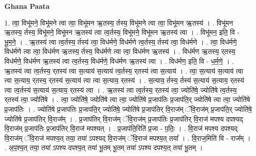 \documentclass[17pt]{extarticle}
\begin{document}
\textbf{Ghana Paata } \newline

1. त्वा॒ विभू॑मने॒ विभू॑मने त्वा त्वा॒ विभू॑मन ऋ॒तस्य॒ र्तस्य॒ विभू॑मने त्वा त्वा॒ विभू॑मन ऋ॒तस्य॑ । . विभू॑मन ऋ॒तस्य॒ र्तस्य॒ विभू॑मने॒ विभू॑मन ऋ॒तस्य॑ त्वा त्व॒र्तस्य॒ विभू॑मने॒ विभू॑मन ऋ॒तस्य॑ त्वा । . विभू॑मन॒ इति॒ वि - भू॒म॒ने॒ । . ऋ॒तस्य॑ त्वा त्व॒र्तस्य॒ र्तस्य॑ त्वा॒ विध॑र्मणे॒ विध॑र्मणे त्व॒र्तस्य॒ र्तस्य॑ त्वा॒ विध॑र्मणे । . त्वा॒ विध॑र्मणे॒ विध॑र्मणे त्वा त्वा॒ विध॑र्मण ऋ॒तस्य॒ र्तस्य॒ विध॑र्मणे त्वा त्वा॒ विध॑र्मण ऋ॒तस्य॑ । . विध॑र्मण ऋ॒तस्य॒ र्‌तस्य॒ विध॑र्मणे॒ विध॑र्मण ऋ॒तस्य॑ त्वा त्व॒र्तस्य॒ विध॑र्मणे॒ विध॑र्मण ऋ॒तस्य॑ त्वा । . विध॑र्मण॒ इति॒ वि - ध॒र्म॒णे॒ । . ऋ॒तस्य॑ त्वा त्व॒र्तस्य॒ र्‌तस्य॑ त्वा स॒त्याय॑ स॒त्याय॑ त्व॒र्तस्य॒ र्‌तस्य॑ त्वा स॒त्याय॑ । . त्वा॒ स॒त्याय॑ स॒त्याय॑ त्वा त्वा स॒त्याय॒ र्‌तस्य॒ र्‌तस्य॑ स॒त्याय॑ त्वा त्वा स॒त्याय॒ र्‌तस्य॑ । . स॒त्याय॒ र्तस्य॒ र्तस्य॑ स॒त्याय॑ स॒त्याय॒ र्‌तस्य॑ त्वा त्व॒र्तस्य॑ स॒त्याय॑ स॒त्याय॒ र्‌तस्य॑ त्वा । . ऋ॒तस्य॑ त्वा त्व॒र्तस्य॒ र्‌तस्य॑ त्वा॒ ज्योति॑षे॒ ज्योति॑षे त्व॒र्तस्य॒ र्‌तस्य॑ त्वा॒ ज्योति॑षे । . त्वा॒ ज्योति॑षे॒ ज्योति॑षे त्वा त्वा॒ ज्योति॑षे प्र॒जाप॑तिः प्र॒जाप॑ति॒र् ज्योति॑षे त्वा त्वा॒ ज्योति॑षे प्र॒जाप॑तिः । . ज्योति॑षे प्र॒जाप॑तिः प्र॒जाप॑ति॒र् ज्योति॑षे॒ ज्योति॑षे प्र॒जाप॑तिर् वि॒राज॑म् ॅवि॒राज॑म् प्र॒जाप॑ति॒र् ज्योति॑षे॒ ज्योति॑षे प्र॒जाप॑तिर् वि॒राज᳚म् । . प्र॒जाप॑तिर् वि॒राज॑म् ॅवि॒राज॑म् प्र॒जाप॑तिः प्र॒जाप॑तिर् वि॒राज॑ मपश्य दपश्यद् वि॒राज॑म् प्र॒जाप॑तिः प्र॒जाप॑तिर् वि॒राज॑ मपश्यत् । . प्र॒जाप॑ति॒रिति॑ प्र॒जा - प॒तिः॒ । . वि॒राज॑ मपश्य दपश्यद् वि॒राज॑म् ॅवि॒राज॑ मपश्य॒त् तया॒ तया॑ ऽपश्यद् वि॒राज॑म् ॅवि॒राज॑ मपश्य॒त् तया᳚ । . वि॒राज॒मिति॑ वि - राज᳚म् । . अ॒प॒श्य॒त् तया॒ तया॑ ऽपश्य दपश्य॒त् तया॑ भू॒तम् भू॒तम् तया॑ ऽपश्य दपश्य॒त् तया॑ भू॒तम् । \newline
\end{document}
